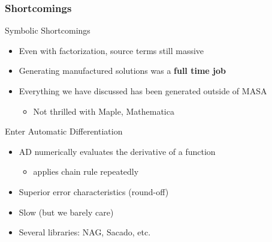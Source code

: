 \documentclass[mathserif]{beamer}
\begin{document}
\begin{frame}
\frametitle{Shortcomings}

\begin{block}{Symbolic Shortcomings}
 \begin{itemize}
  \item Even with factorization, source terms still massive
  \item Generating manufactured solutions was a {\bf full time job}
  \item Everything we have discussed has been generated outside of MASA
	\begin{itemize}
	 \item Not thrilled with Maple, Mathematica
	\end{itemize}
 \end{itemize}
\end{block}

 \begin{block}{Enter Automatic Differentiation}
  \begin{itemize}
   \item AD numerically evaluates the derivative of a function 
	\begin{itemize}
	 \item applies chain rule repeatedly 
	\end{itemize}
   \item Superior error characteristics (round-off)
   \item Slow (but we barely care)
   \item Several libraries: NAG, Sacado, etc.
  \end{itemize}
 \end{block}
\end{frame}
\end{document}
